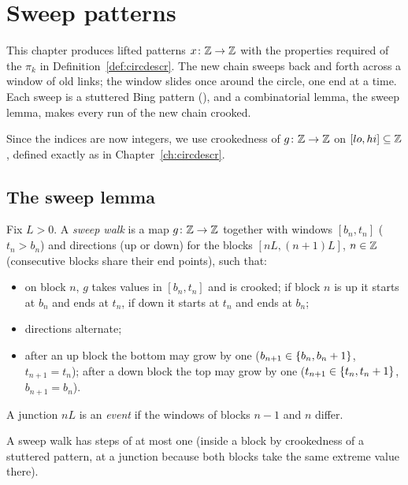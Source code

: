 \chapter{Sweep patterns}\label{ch:sweep}

This chapter produces lifted patterns $x\colon\mathbb{Z}\to\mathbb{Z}$ with the properties required of the $\pi_k$ in Definition~\ref{def:circdescr}. The new chain sweeps back
and forth across a window of old links; the window slides once around the circle, one end at a time. Each sweep is a stuttered Bing pattern (), and a combinatorial lemma, the sweep lemma, makes every run of the new chain crooked.

Since the indices are now integers, we use crookedness of $g\colon\mathbb{Z}\to\mathbb{Z}$ on $[lo,hi]\subseteq\mathbb{Z}$, defined exactly as in Chapter~\ref{ch:circdescr}.


\section{The sweep lemma}

\begin{definition}\label{def:sweep-walk}
Fix $L>0$. A \emph{sweep walk} is a map $g\colon\mathbb{Z}\to\mathbb{Z}$ together with windows $[b_n,t_n]$ ($t_n>b_n$) and directions (up or down) for the blocks $[nL,(n+1)L]$,
$n\in\mathbb{Z}$ (consecutive blocks share their end points), such that:
\begin{itemize}
\item on block $n$, $g$ takes values in $[b_n,t_n]$ and is crooked; if block $n$ is up it starts at $b_n$ and ends at $t_n$, if down it starts at $t_n$ and ends at $b_n$;
\item directions alternate;
\item after an up block the bottom may grow by one ($b_{n+1}\in\left\{ b_n,b_n+1 \right\}$, $t_{n+1}=t_n$); after a down block the top may grow by one ($t_{n+1}\in\left\{ t_n,t_n+1 \right\}$,
$b_{n+1}=b_n$).
\end{itemize}
A junction $nL$ is an \emph{event} if the windows of blocks $n-1$ and $n$ differ.
\end{definition}

A sweep walk has steps of at most one (inside a block by crookedness of a stuttered pattern, at a junction because both blocks take the same extreme value there).

